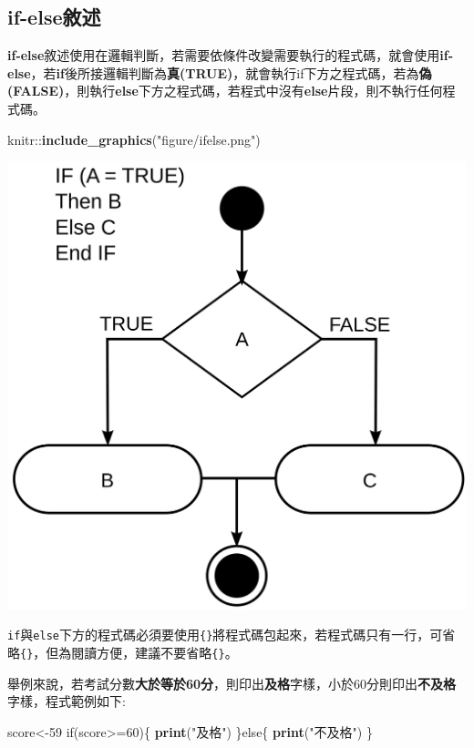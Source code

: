 \documentclass[]{book}
\newenvironment{Shaded}{\begin{snugshade}}{\end{snugshade}}
\newcommand{\KeywordTok}[1]{\textcolor[rgb]{0.13,0.29,0.53}{\textbf{{#1}}}}
\newcommand{\DecValTok}[1]{\textcolor[rgb]{0.00,0.00,0.81}{{#1}}}
\newcommand{\StringTok}[1]{\textcolor[rgb]{0.31,0.60,0.02}{{#1}}}
\newcommand{\NormalTok}[1]{{#1}}
\theoremstyle{definition}
\theoremstyle{definition}
\theoremstyle{remark}
\begin{document}
\subsection{if-else敘述}\label{if-else}

\textbf{if-else}敘述使用在邏輯判斷，若需要依條件改變需要執行的程式碼，就會使用\textbf{if-else}，若\textbf{if}後所接邏輯判斷為\textbf{真(TRUE)}，就會執行if下方之程式碼，若為\textbf{偽(FALSE)}，則執行\textbf{else}下方之程式碼，若程式中沒有\textbf{else}片段，則不執行任何程式碼。

\begin{Shaded}
\begin{Highlighting}[]
\NormalTok{knitr::}\KeywordTok{include_graphics}\NormalTok{(}\StringTok{"figure/ifelse.png"}\NormalTok{)}
\end{Highlighting}
\end{Shaded}

\includegraphics{figure/ifelse.png}

\texttt{if}與\texttt{else}下方的程式碼必須要使用\texttt{\{\}}將程式碼包起來，若程式碼只有一行，可省略\texttt{\{\}}，但為閱讀方便，建議不要省略\texttt{\{\}}。

舉例來說，若考試分數\textbf{大於等於60分}，則印出\textbf{及格}字樣，小於60分則印出\textbf{不及格}字樣，程式範例如下:

\begin{Shaded}
\begin{Highlighting}[]
\NormalTok{score<-}\DecValTok{59}
\NormalTok{if(score>=}\DecValTok{60}\NormalTok{)\{}
  \KeywordTok{print}\NormalTok{(}\StringTok{"及格"}\NormalTok{)}
\NormalTok{\}else\{}
  \KeywordTok{print}\NormalTok{(}\StringTok{"不及格"}\NormalTok{)}
\NormalTok{\}}
\end{Highlighting}
\end{Shaded}
\end{document}
